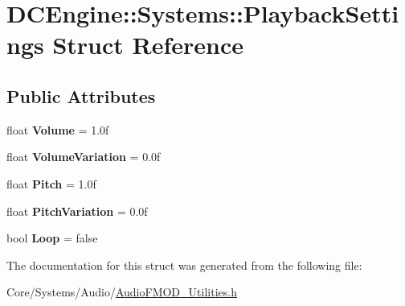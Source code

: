 \hypertarget{structDCEngine_1_1Systems_1_1PlaybackSettings}{\section{D\-C\-Engine\-:\-:Systems\-:\-:Playback\-Settings Struct Reference}
\label{structDCEngine_1_1Systems_1_1PlaybackSettings}
}
\subsection*{Public Attributes}
\begin{DoxyCompactItemize}
\item 
\hypertarget{structDCEngine_1_1Systems_1_1PlaybackSettings_a8ea382d9789ea26244d4710eb908e849}{float {\bfseries Volume} = 1.\-0f}\label{structDCEngine_1_1Systems_1_1PlaybackSettings_a8ea382d9789ea26244d4710eb908e849}

\item 
\hypertarget{structDCEngine_1_1Systems_1_1PlaybackSettings_a0da3388d0e50c10aa76372f75b7cf063}{float {\bfseries Volume\-Variation} = 0.\-0f}\label{structDCEngine_1_1Systems_1_1PlaybackSettings_a0da3388d0e50c10aa76372f75b7cf063}

\item 
\hypertarget{structDCEngine_1_1Systems_1_1PlaybackSettings_a4e745a8c5a235dc10e43ad5413e554c0}{float {\bfseries Pitch} = 1.\-0f}\label{structDCEngine_1_1Systems_1_1PlaybackSettings_a4e745a8c5a235dc10e43ad5413e554c0}

\item 
\hypertarget{structDCEngine_1_1Systems_1_1PlaybackSettings_a52654dda33e771a1603e7f5b54715eee}{float {\bfseries Pitch\-Variation} = 0.\-0f}\label{structDCEngine_1_1Systems_1_1PlaybackSettings_a52654dda33e771a1603e7f5b54715eee}

\item 
\hypertarget{structDCEngine_1_1Systems_1_1PlaybackSettings_a8a7854017f55fb63ef0e0b512fb1472d}{bool {\bfseries Loop} = false}\label{structDCEngine_1_1Systems_1_1PlaybackSettings_a8a7854017f55fb63ef0e0b512fb1472d}

\end{DoxyCompactItemize}


The documentation for this struct was generated from the following file\-:\begin{DoxyCompactItemize}
\item 
Core/\-Systems/\-Audio/\hyperlink{AudioFMOD__Utilities_8h}{Audio\-F\-M\-O\-D\-\_\-\-Utilities.\-h}\end{DoxyCompactItemize}
